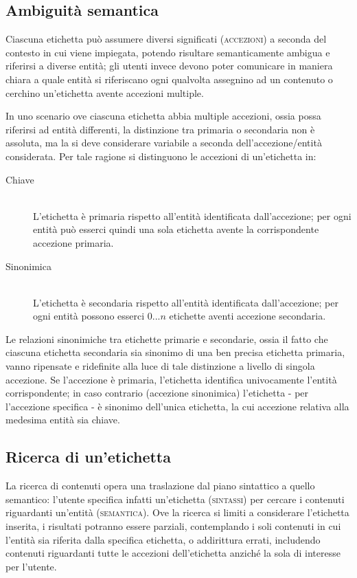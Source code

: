 \documentclass[10pt,a4paper,headinclude,footinclude,hidelinks]{scrreprt} %
\begin{document}
	\subsection{Ambiguità semantica}
	\label{sec:stage:design:etichette:accezioni}
	Ciascuna etichetta può assumere diversi significati (\textsc{accezioni}) a seconda del contesto in cui viene impiegata, potendo risultare semanticamente ambigua e riferirsi a diverse entità; gli utenti invece devono poter comunicare in maniera chiara a quale entità si riferiscano ogni qualvolta assegnino ad un contenuto o cerchino un'etichetta avente accezioni multiple.

	In uno scenario ove ciascuna etichetta abbia multiple accezioni, ossia possa riferirsi ad entità differenti, la distinzione tra primaria o secondaria non è assoluta, ma la si deve considerare variabile a seconda dell'accezione/entità considerata. Per tale ragione si distinguono le accezioni di un'etichetta in:
	\begin{description}
	\item[Chiave] \hfill \\
	L'etichetta è primaria rispetto all'entità identificata dall'accezione; per ogni entità può esserci quindi una sola etichetta avente la corrispondente accezione primaria. 
	\item[Sinonimica] \hfill \\
	L'etichetta è secondaria rispetto all'entità identificata dall'accezione; per ogni entità possono esserci $0...n$ etichette aventi accezione secondaria.
	\end{description}

	Le relazioni sinonimiche tra etichette primarie e secondarie, ossia il fatto che ciascuna etichetta secondaria sia sinonimo di una ben precisa etichetta primaria, vanno ripensate e ridefinite alla luce di tale distinzione a livello di singola accezione. Se l'accezione è primaria, l'etichetta identifica univocamente l'entità corrispondente; in caso contrario (accezione sinonimica) l'etichetta - per l'accezione specifica - è sinonimo dell'unica etichetta, la cui accezione relativa alla medesima entità sia chiave. 

	\subsection{Ricerca di un'etichetta}
	La ricerca di contenuti opera una traslazione dal piano sintattico a quello semantico: l'utente specifica infatti un'etichetta (\textsc{sintassi}) per cercare i contenuti riguardanti un'entità (\textsc{semantica}). Ove la ricerca si limiti a considerare l'etichetta inserita, i risultati potranno essere parziali, contemplando i soli contenuti in cui l'entità sia riferita dalla specifica etichetta, o addirittura errati, includendo contenuti riguardanti tutte le accezioni dell'etichetta anziché la sola di interesse per l'utente.
	
\end{document}
